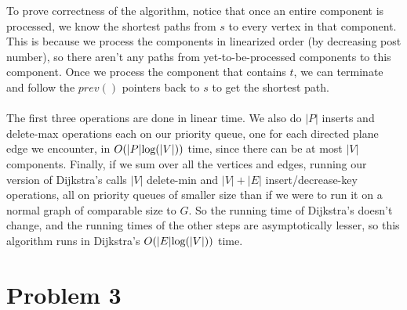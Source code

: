 \documentclass[11pt]{article}
\let\origleft\left
\let\origright\right
\renewcommand{\left}{\mathopen{}\mathclose\bgroup\origleft}
\renewcommand{\right}{\aftergroup\egroup\origright}
\newcommand{\p}[1]{\left(#1\right)}
\renewcommand{\log}[1]{\text{log}\p{#1}}
\newcommand{\BigOh}[1]{O\p{#1}}
\begin{document}
To prove correctness of the algorithm, notice that once an entire component is processed, we know the shortest paths from $s$ to every vertex in that component. This is because we process the components in linearized order (by decreasing post number), so there aren't any paths from yet-to-be-processed components to this component. Once we process the component that contains $t$, we can terminate and follow the $prev()$ pointers back to $s$ to get the shortest path. \\\\
The first three operations are done in linear time. We also do $|P|$ inserts and delete-max operations each on our priority queue, one for each directed plane edge we encounter, in $\BigOh{|P|\log{|V|}}$ time, since there can be at most $|V|$ components. Finally, if we sum over all the vertices and edges, running our version of Dijkstra's calls $|V|$ delete-min and $|V|+|E|$ insert/decrease-key operations, all on priority queues of smaller size than if we were to run it on a normal graph of comparable size to $G$. So the running time of Dijkstra's doesn't change, and the running times of the other steps are asymptotically lesser, so this algorithm runs in Dijkstra's $\BigOh{|E|\log{|V|}}$ time.

\newpage
\section*{Problem 3}


\newpage
\end{document}
